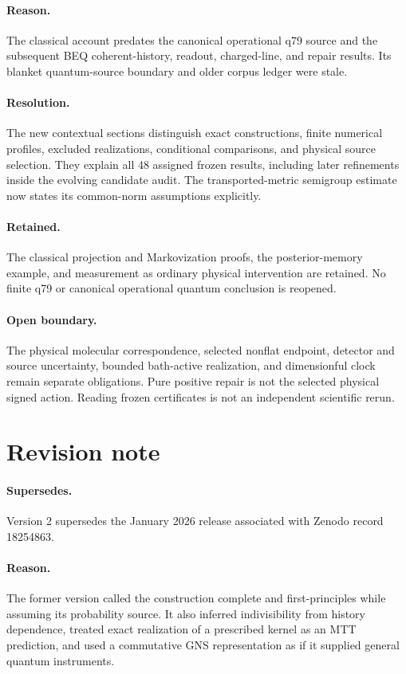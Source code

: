 \documentclass[11pt]{article}
\theoremstyle{definition}
\theoremstyle{remark}
\begin{document}
\paragraph{Reason.}
The classical account predates the canonical operational q79 source and the
subsequent BEQ coherent-history, readout, charged-line, and repair results.
Its blanket quantum-source boundary and older corpus ledger were stale.
\paragraph{Resolution.}
The new contextual sections distinguish exact constructions, finite numerical
profiles, excluded realizations, conditional comparisons, and physical source
selection. They explain all 48 assigned frozen results, including later
refinements inside the evolving candidate audit. The transported-metric
semigroup estimate now states its common-norm assumptions explicitly.
\paragraph{Retained.}
The classical projection and Markovization proofs, the posterior-memory
example, and measurement as ordinary physical intervention are retained.
No finite q79 or canonical operational quantum conclusion is reopened.
\paragraph{Open boundary.}
The physical molecular correspondence, selected nonflat endpoint, detector
and source uncertainty, bounded bath-active realization, and dimensionful
clock remain separate obligations. Pure positive repair is not the selected
physical signed action. Reading frozen certificates is not an independent
scientific rerun.

\section*{Revision note}

\paragraph{Supersedes.}
Version 2 supersedes the January 2026 release associated with Zenodo record
18254863.

\paragraph{Reason.}
The former version called the construction complete and first-principles while
assuming its probability source.  It also inferred indivisibility from history
dependence, treated exact realization of a prescribed kernel as an MTT
prediction, and used a commutative GNS representation as if it supplied
general quantum instruments.
\end{document}
